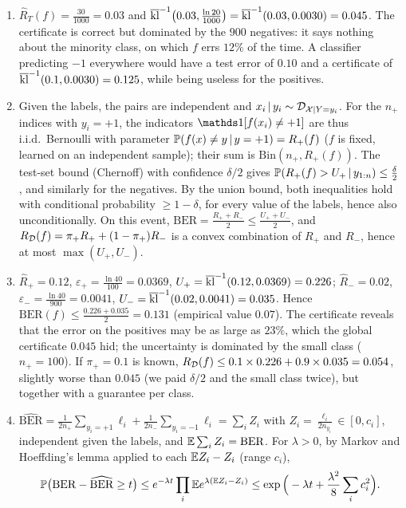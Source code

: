 \documentclass[11pt]{article}
\begin{document}
\begin{solution}
\begin{enumerate}
\item $\widehat R_T(f)=\frac{30}{1000}=0.03$ and $\klup\big(0.03,\frac{\ln20}{1000}\big)=\klup(0.03,0.0030)=0.045$. The certificate is correct
      but dominated by the $900$ negatives: it says nothing about the minority class, on which $f$ errs $12\%$ of the
      time. A classifier predicting $-1$ everywhere would have a test error of $0.10$ and a certificate of $\klup(0.1,0.0030)=0.125$,
      while being useless for the positives.
\item Given the labels, the pairs are independent and $x_i\,|\,y_i\sim\D_{\X|Y=y_i}$. For the $n_+$ indices with $y_i=+1$, the
      indicators $\ind{f(x_i)\neq+1}$ are thus i.i.d.\ Bernoulli with parameter $\P(f(x)\neq y\,|\,y=+1)=R_+(f)$ ($f$ is fixed,
      learned on an independent sample); their sum is $\mathrm{Bin}(n_+,R_+(f))$. The test-set bound (Chernoff) with
      confidence $\delta/2$ gives $\P(R_+(f)>U_+\,|\,y_{1:n})\leq\frac\delta2$, and similarly for the negatives. By the union bound,
      both inequalities hold with conditional probability $\geq1-\delta$, for every value of the labels, hence also
      unconditionally. On this event, $\mathrm{BER}=\frac{R_++R_-}2\leq\frac{U_++U_-}2$, and $\RD(f)=\pi_+R_++(1-\pi_+)R_-$ is a
      convex combination of $R_+$ and $R_-$, hence at most $\max(U_+,U_-)$.
\item $\widehat R_+=0.12$, $\varepsilon_+=\frac{\ln40}{100}=0.0369$, $U_+=\klup(0.12,0.0369)=0.226$; $\widehat R_-=0.02$,
      $\varepsilon_-=\frac{\ln40}{900}=0.0041$, $U_-=\klup(0.02,0.0041)=0.035$. Hence $\mathrm{BER}(f)\leq\frac{0.226+0.035}2=0.131$ (empirical
      value $0.07$). The certificate reveals that the error on the positives may be as large as $23\%$, which the
      global certificate $0.045$ hid; the uncertainty is dominated by the small class ($n_+=100$). If $\pi_+=0.1$ is
      known, $\RD(f)\leq0.1\times0.226+0.9\times0.035=0.054$, slightly worse than $0.045$ (we paid $\delta/2$ and the
      small class twice), but together with a guarantee per class.
\item $\widehat{\mathrm{BER}}=\frac1{2n_+}\sum_{y_i=+1}\ell_i+\frac1{2n_-}\sum_{y_i=-1}\ell_i=\sum_iZ_i$ with $Z_i=\frac{\ell_i}{2n_{y_i}}\in[0,c_i]$, independent given
      the labels, and $\E\sum_iZ_i=\mathrm{BER}$. For $\lambda>0$, by Markov and Hoeffding's lemma applied to each
      $\E Z_i-Z_i$ (range $c_i$),
      \[\P\big(\mathrm{BER}-\widehat{\mathrm{BER}}\geq t\big)\leq e^{-\lambda t}\prod_i\E e^{\lambda(\E Z_i-Z_i)}\leq\exp\Big(-\lambda t+\frac{\lambda^2}8\sum_ic_i^2\Big).\]

\end{enumerate}
\end{solution}
\end{document}
